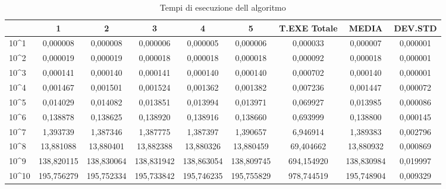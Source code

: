 \documentclass[12pt,a4paper]{report}
\begin{document}
\begin{table}[h]
\begin{tabular}{| l | c | c | c | c | c | c | c  | c |}
\hline
             & 1          & 2          & 3          & 4          & 5          & T.EXE Totale & MEDIA      & DEV.STD  \\ \hline
10\textasciicircum{}1  & 0,000008   & 0,000008   & 0,000006   & 0,000005   & 0,000006   & 0,000033     & 0,000007   & 0,000001 \\ \hline
10\textasciicircum{}2  & 0,000019   & 0,000019   & 0,000018   & 0,000018   & 0,000018   & 0,000092     & 0,000018   & 0,000001 \\ \hline
10\textasciicircum{}3  & 0,000141   & 0,000140   & 0,000141   & 0,000140   & 0,000140   & 0,000702     & 0,000140   & 0,000001 \\ \hline
10\textasciicircum{}4  & 0,001467   & 0,001501   & 0,001524   & 0,001362   & 0,001382   & 0,007236     & 0,001447   & 0,000072 \\ \hline
10\textasciicircum{}5  & 0,014029   & 0,014082   & 0,013851   & 0,013994   & 0,013971   & 0,069927     & 0,013985   & 0,000086 \\ \hline
10\textasciicircum{}6  & 0,138878   & 0,138625   & 0,138920   & 0,138916   & 0,138660   & 0,693999     & 0,138800   & 0,000145 \\ \hline
10\textasciicircum{}7  & 1,393739   & 1,387346   & 1,387775   & 1,387397   & 1,390657   & 6,946914     & 1,389383   & 0,002796 \\ \hline
10\textasciicircum{}8  & 13,881088  & 13,880401  & 13,882388  & 13,880326  & 13,880459  & 69,404662    & 13,880932  & 0,000869 \\ \hline
10\textasciicircum{}9  & 138,820115 & 138,830064 & 138,831942 & 138,863054 & 138,809745 & 694,154920   & 138,830984 & 0,019997 \\ \hline
10\textasciicircum{}10 & 195,756279 & 195,752334 & 195,733842 & 195,746235 & 195,755829 & 978,744519   & 195,748904 & 0,009329 \\ \hline
\end{tabular}
\caption{Tempi di esecuzione dell algoritmo}
\label{Tab:TimeExceMCPi}
\end{table}
\end{document}
